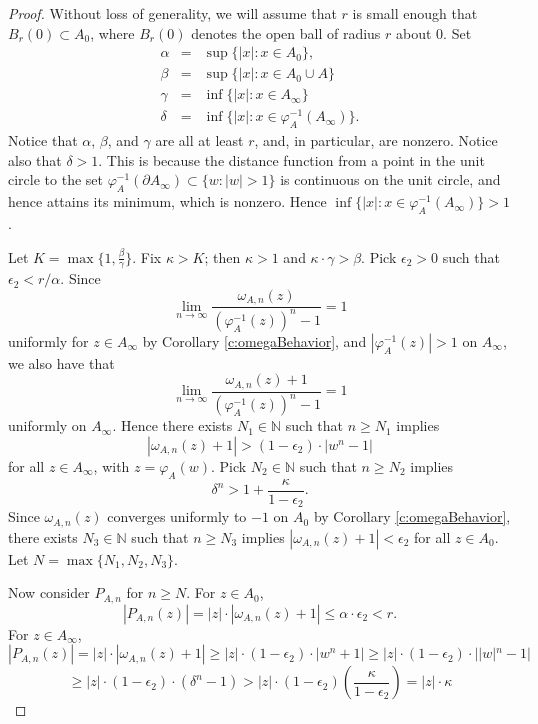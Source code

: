 \documentclass[a4paper,11pt,onecolumn]{amsart}
\theoremstyle{definition}
\begin{document}
\begin{proof}

Without loss of generality, we will assume that $r$ is small enough that  $B_r(0) \subset A_0$, where $B_r(0)$ denotes the open ball of radius $r$ about $0$.  Set 
$$\begin{array}{lcl}
\alpha &=& \sup \{|x|:x \in A_0\},  \\
\beta &=& \sup \{|x| : x \in A_0 \cup A \} \\
\gamma &=& \inf \{|x| : x \in A_{\infty} \} \\
\delta &=& \inf \{|x| : x \in \varphi_A^{-1}(A_{\infty}) \}.
 \end{array}$$
Notice that $\alpha$, $\beta$, and $\gamma$ are all at least $r$, and, in particular, are nonzero.  Notice also that $\delta > 1$. This is because the distance function from a point in the unit circle to the set $\varphi_A^{-1}(\partial A_{\infty}) \subset \{w:|w|>1\}$ is continuous on the unit circle, and hence attains its minimum, which is nonzero. Hence $\inf \{|x| : x \in \varphi_A^{-1}(A_{\infty}) \} > 1$.

Let $K = \max\{1, \frac{\beta}{\gamma}\}$.  Fix $\kappa > K$; then $\kappa>1$ and $\kappa \cdot \gamma > \beta$.  Pick $\epsilon_2 > 0$ such that $\epsilon_2 < r/\alpha$. Since $$\lim_{n\rightarrow \infty} \frac{\omega_{A,n}(z)}{(\varphi_A^{-1}(z))^n -1}=1$$ uniformly for $z \in A_{\infty}$ by Corollary \ref{c:omegaBehavior}, and $|\varphi_A^{-1}(z)| > 1$ on $ A_{\infty}$, we also have that  $$\lim_{n\rightarrow \infty} \frac{\omega_{A,n}(z)+1}{(\varphi_A^{-1}(z))^n -1}=1$$ uniformly on $A_{\infty}$.  Hence there exists $N_1 \in \mathbb{N}$ such that $n \geq N_1$ implies $$|\omega_{A,n}(z) +1| > (1-\epsilon_2) \cdot |w^n-1|$$ for all $z \in A_{\infty}$, with $z = \varphi_A(w)$.  
  Pick $N_2 \in \mathbb{N}$ such that $n \geq N_2$ implies $$\delta^n> 1 + \frac{\kappa}{1-\epsilon_2}.$$
  Since $\omega_{A,n}(z)$ converges uniformly to $-1$ on $A_0$ by Corollary \ref{c:omegaBehavior}, there exists $N_3 \in \mathbb{N}$ such that $n \geq N_3$ implies $|\omega_{A,n}(z) + 1| < \epsilon_2$ for all $z \in A_0$.   Let $N = \max \{N_1,N_2,N_3\}$. 
  
  Now consider $P_{A,n}$ for $n \geq N$.  For $z \in A_0$, $$|P_{A,n}(z)| = |z| \cdot |\omega_{A,n}(z)+1| \leq \alpha \cdot \epsilon_2 < r.$$ 
  For $z \in A_{\infty}$, 
  $$|P_{A,n}(z)| = |z| \cdot |\omega_{A,n}(z) +1| \geq |z| \cdot (1-\epsilon_2) \cdot |w^n+1| \geq |z| \cdot (1-\epsilon_2) \cdot | |w|^n - 1|  $$
  $$ \geq  |z| \cdot (1-\epsilon_2) \cdot (\delta^n -1) > |z| \cdot (1-\epsilon_2)(\frac{\kappa}{1-\epsilon_2}) = |z| \cdot \kappa$$
\end{proof}
\end{document}
